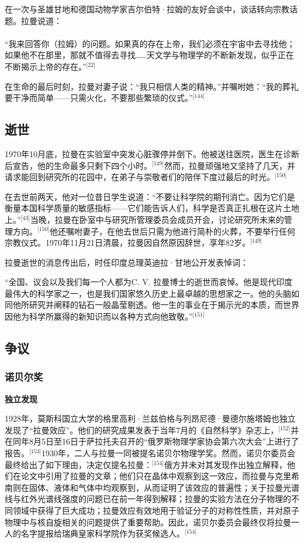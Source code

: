 在一次与圣雄甘地和德国动物学家吉尔伯特·拉姆的友好会谈中，谈话转向宗教话题。拉曼说道：\\\\
“我来回答你（拉姆）的问题。如果真的存在上帝，我们必须在宇宙中去寻找他；如果他不在那里，那就不值得去寻找……天文学与物理学的不断新发现，似乎正在不断揭示上帝的存在。”\(^\text{[22]}\)

在生命的最后时刻，拉曼对妻子说：“我只相信人类的精神。”并嘱咐她：“我的葬礼要干净而简单——只需火化，不要那些繁琐的仪式。”\(^\text{[144]}\)
\subsection{逝世}
1970年10月底，拉曼在实验室中突发心脏骤停并倒下。他被送往医院，医生在诊断后宣告，他的生命最多只剩下四个小时。\(^\text{[149]}\)然而，拉曼顽强地又坚持了几天，并请求能回到研究所的花园中，在弟子与崇敬者们的陪伴下度过最后的时光。\(^\text{[150]}\)

在去世前两天，他对一位昔日学生说道：“不要让科学院的期刊消亡。因为它们是衡量本国科学质量的敏感指标——它们能告诉人们，科学是否真正扎根在这片土地上。”\(^\text{[43]}\)当晚，拉曼在卧室中与研究所管理委员会成员开会，讨论研究所未来的管理方向。\(^\text{[150]}\)他还嘱咐妻子，在他去世后只需为他进行简朴的火葬，不要举行任何宗教仪式。1970年11月21日清晨，拉曼因自然原因辞世，享年82岁。\(^\text{[149]}\)

拉曼逝世的消息传出后，时任印度总理英迪拉·甘地公开发表悼词：

“全国、议会以及我们每一个人都为C. V. 拉曼博士的逝世而哀悼。他是现代印度最伟大的科学家之一，也是我们国家悠久历史上最卓越的思想家之一。他的头脑如同他所研究并阐释的钻石一般晶莹剔透。他一生的事业在于揭示光的本质，而世界因他为科学所赢得的新知识而以各种方式向他致敬。”\(^\text{[151]}\)
\subsection{争议}
\subsubsection{诺贝尔奖}
\textbf{独立发现}

1928年，莫斯科国立大学的格里高利·兰兹伯格与列昂尼德·曼德尔施塔姆也独立发现了“拉曼效应”。他们的研究成果发表于当年7月的《自然科学》杂志上，\(^\text{[152]}\)并在同年8月5日至16日于萨拉托夫召开的“俄罗斯物理学家协会第六次大会”上进行了报告。\(^\text{[153]}\)1930年，二人与拉曼一同被提名诺贝尔物理学奖。然而，诺贝尔委员会最终给出了如下理由，决定仅提名拉曼：\(^\text{[154]}\)俄方并未对其发现作出独立解释，他们在论文中引用了拉曼的文章；他们只在晶体中观察到这一效应，而拉曼与克里希南则在固体、液体和气体中均观察到，从而证明了该效应的普遍性；关于拉曼光谱线与红外光谱线强度的问题已在前一年得到解释；拉曼的实验方法在分子物理的不同领域中获得了巨大成功；拉曼效应有效地用于验证分子的对称性性质，并对原子物理中与核自旋相关的问题提供了重要帮助。因此，诺贝尔委员会最终仅将拉曼一人的名字提报给瑞典皇家科学院作为获奖候选人。\(^\text{[154]}\)

